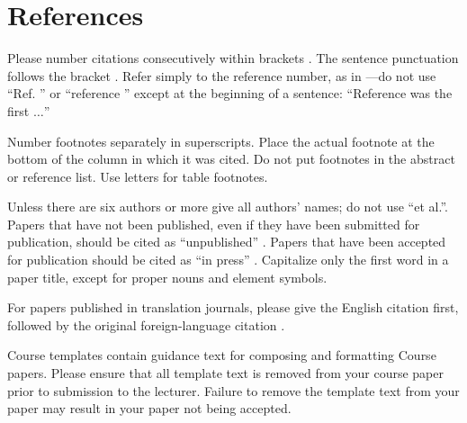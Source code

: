 \documentclass[conference]{IEEEtran}
\begin{document}
\section*{References}

Please number citations consecutively within brackets \cite{eason1955certain}.
The sentence punctuation follows the bracket \cite{clerk1892maxwell}. Refer simply to the reference number, as in \cite{jacobs1963fine}---do not use ``Ref. \cite{jacobs1963fine}'' or ``reference \cite{jacobs1963fine}'' except at 
the beginning of a sentence: ``Reference \cite{jacobs1963fine} was the first $\ldots$''

Number footnotes separately in superscripts. Place the actual footnote at 
the bottom of the column in which it was cited. Do not put footnotes in the 
abstract or reference list. Use letters for table footnotes.

Unless there are six authors or more give all authors' names; do not use 
``et al.''. Papers that have not been published, even if they have been 
submitted for publication, should be cited as ``unpublished'' \cite{nicoletitle}. Papers 
that have been accepted for publication should be cited as ``in press'' \cite{elissatitle}. 
Capitalize only the first word in a paper title, except for proper nouns and 
element symbols.

For papers published in translation journals, please give the English 
citation first, followed by the original foreign-language citation \cite{yorozu1987electron}.




\vspace{12pt}
\color{red}
Course templates contain guidance text for composing and formatting Course papers. Please ensure that all template text is removed from your course paper prior to submission to the lecturer. Failure to remove the template text from your paper may result in your paper not being accepted.
\end{document}
